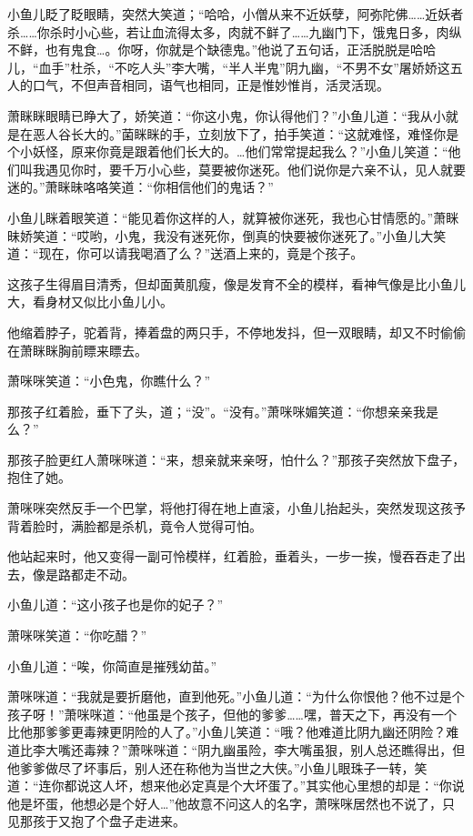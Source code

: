 \documentclass[12pt,oneside]{book}
\begin{document}
小鱼儿眨了眨眼睛，突然大笑道；``哈哈，小僧从来不近妖孽，阿弥陀佛\ldots\ldots 近妖者杀\ldots\ldots 你杀时小心些，若让血流得太多，肉就不鲜了\ldots\ldots 九幽门下，饿鬼日多，肉纵不鲜，也有鬼食\ldots。你呀，你就是个缺德鬼。''他说了五句话，正活脱脱是哈哈儿，``血手''杜杀，``不吃人头''李大嘴，``半人半鬼''阴九幽，``不男不女''屠娇娇这五人的口气，不但声音相同，语气也相同，正是惟妙惟肖，活灵活现。

萧眯眯眼睛已睁大了，娇笑道：``你这小鬼，你认得他们？''小鱼儿道：``我从小就是在恶人谷长大的。''菌眯眯的手，立刻放下了，拍手笑道：``这就难怪，难怪你是个小妖怪，原来你竟是跟着他们长大的。\ldots 他们常常提起我么？''小鱼儿笑道：``他们叫我遇见你时，要千万小心些，莫要被你迷死。他们说你是六亲不认，见人就要迷的。''萧眯昧咯咯笑道：``你相信他们的鬼话？''

小鱼儿眯着眼笑道：``能见着你这样的人，就算被你迷死，我也心甘情愿的。''萧眯昧娇笑道：``哎哟，小鬼，我没有迷死你，倒真的快要被你迷死了。''小鱼儿大笑道：``现在，你可以请我喝酒了么？''送酒上来的，竟是个孩子。

这孩子生得眉目清秀，但却面黄肌瘦，像是发育不全的模样，看神气像是比小鱼儿大，看身材又似比小鱼儿小。

他缩着脖子，驼着背，捧着盘的两只手，不停地发抖，但一双眼睛，却又不时偷偷在萧眯眯胸前瞟来瞟去。

萧咪咪笑道：``小色鬼，你瞧什么？''

那孩子红着脸，垂下了头，道；``没''。``没有。''萧咪咪媚笑道：``你想亲亲我是么？''

那孩子脸更红人萧咪咪道：``来，想亲就来亲呀，怕什么？''那孩子突然放下盘子，抱住了她。

萧咪咪突然反手一个巴掌，将他打得在地上直滚，小鱼儿抬起头，突然发现这孩予背着脸时，满脸都是杀机，竟令人觉得可怕。

他站起来时，他又变得一副可怜模样，红着脸，垂着头，一步一挨，慢吞吞走了出去，像是路都走不动。

小鱼儿道：``这小孩子也是你的妃子？''

萧咪咪笑道：``你吃醋？''

小鱼儿道：``唉，你简直是摧残幼苗。''

萧咪咪道：``我就是要折磨他，直到他死。''小鱼儿道：``为什么你恨他？他不过是个孩子呀！''萧咪咪道：``他虽是个孩子，但他的爹爹\ldots\ldots 嘿，普天之下，再没有一个比他那爹爹更毒辣更阴险的人了。''小鱼儿笑道：``哦？他难道比阴九幽还阴险？难道比李大嘴还毒辣？''萧咪咪道：``阴九幽虽险，李大嘴虽狠，别人总还瞧得出，但他爹爹做尽了坏事后，别人还在称他为当世之大侠。''小鱼儿眼珠子一转，笑道：``连你都说这人坏，想来他必定真是个大坏蛋了。''其实他心里想的却是：``你说他是坏蛋，他想必是个好人\ldots{}''他故意不问这人的名字，萧咪咪居然也不说了，只见那孩于又抱了个盘子走进来。
\end{document}
